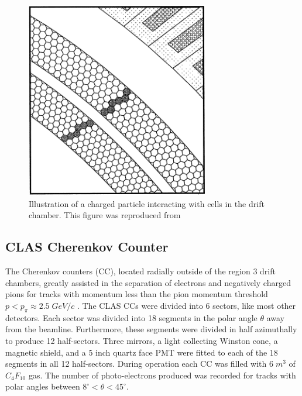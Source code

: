 \begin{figure}
	\centering
		\includegraphics[width=8cm]{image/diagrams/dc-hexagonal-cells.png}
		\caption{Illustration of a charged particle interacting with cells in the drift chamber.  This figure was reproduced from \cite{hardware-mestayer:2000}}
\end{figure}
    
\subsection{CLAS Cherenkov Counter}
The Cherenkov counters (CC), located radially outside of the region 3 drift chambers, greatly assisted in the separation of electrons and negatively charged pions for tracks with momentum less than the pion momentum threshold $p < p_{\pi} \approx 2.5 \; GeV/c$ \cite{hardware-adams:2001}.  The CLAS CCs were divided into 6 sectors, like most other detectors.  Each sector was divided into 18 segments in the polar angle $\theta$ away from the beamline.  Furthermore, these segments were divided in half azimuthally to produce 12 half-sectors.  Three mirrors, a light collecting Winston cone, a magnetic shield, and a 5 inch quartz face PMT were fitted to each of the 18 segments in all 12 half-sectors.  During operation each CC was filled with $6 \; m^3$ of $C_{4} F_{10}$ gas.  The number of photo-electrons produced was recorded for tracks with polar angles between $8^\circ < \theta < 45^\circ$.  


